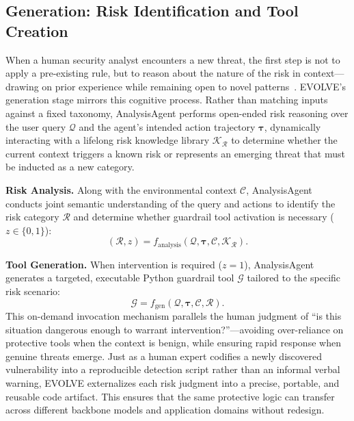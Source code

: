   \subsection{Generation: Risk Identification and Tool Creation}

  When a human security analyst encounters a new threat, the first step is not to apply a pre-existing rule, but to reason about the nature of the risk in context---drawing on prior experience while remaining open to
  novel patterns~\citep{weick2011managing}. EVOLVE's generation stage mirrors this cognitive process. Rather than matching inputs against a fixed taxonomy, AnalysisAgent performs open-ended risk reasoning over the user
  query $\mathcal{Q}$ and the agent's intended action trajectory $\boldsymbol{\tau}$, dynamically interacting with a lifelong risk knowledge library $\mathcal{K}_{\mathcal{R}}$ to determine whether the current context triggers
   a known risk or represents an emerging threat that must be inducted as a new category.

  \noindent\textbf{Risk Analysis.} Along with the environmental context $\mathcal{C}$, AnalysisAgent conducts joint semantic understanding of the query and actions to identify the risk category $\mathcal{R}$ and determine whether guardrail tool activation is necessary
  ($z \in \{0, 1\}$):
  \begin{equation}
      (\mathcal{R}, z) = f_{\mathrm{analysis}}\left(\mathcal{Q}, \boldsymbol{\tau}, \mathcal{C}, \mathcal{K}_{\mathcal{R}}\right).
  \end{equation}

  \noindent\textbf{Tool Generation.} When intervention is required ($z = 1$), AnalysisAgent generates a targeted, executable Python guardrail tool $\mathcal{G}$ tailored to the specific risk scenario:
  \begin{equation}
      \mathcal{G} = f_{\mathrm{gen}}(\mathcal{Q}, \boldsymbol{\tau}, \mathcal{C}, \mathcal{R}).
  \end{equation}
  This on-demand invocation mechanism parallels the human judgment of ``is this situation dangerous enough to warrant intervention?''---avoiding over-reliance on protective tools when the context is benign, while ensuring rapid response when genuine threats emerge. Just as a human expert codifies a newly discovered vulnerability into a reproducible detection script rather than an informal verbal warning, EVOLVE externalizes each risk judgment into a precise, portable, and reusable code artifact. This ensures that the same protective logic can transfer across different backbone models and application domains without redesign.

